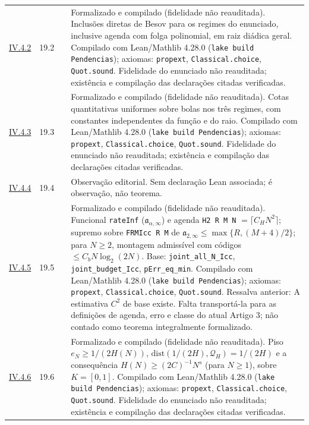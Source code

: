 \begin{longtable}{@{}p{.11\linewidth}p{.09\linewidth}p{.09\linewidth}p{.59\linewidth}@{}}
\hyperref[map:artigo_3:4.2]{IV.4.2} & 19.2 & \pageref{map:artigo_3:4.2} & Formalizado e compilado (fidelidade não reauditada). Inclusões diretas de Besov para os regimes do enunciado, inclusive agenda com folga polinomial, em raiz diádica geral. Compilado com Lean/Mathlib 4.28.0 (\texttt{lake build Pendencias}); axiomas: \texttt{propext}, \texttt{Classical.choice}, \texttt{Quot.sound}. Fidelidade do enunciado não reauditada; existência e compilação das declarações citadas verificadas.\\[4pt]
\hyperref[map:artigo_3:4.3]{IV.4.3} & 19.3 & \pageref{map:artigo_3:4.3} & Formalizado e compilado (fidelidade não reauditada). Cotas quantitativas uniformes sobre bolas nos três regimes, com constantes independentes da função e do raio. Compilado com Lean/Mathlib 4.28.0 (\texttt{lake build Pendencias}); axiomas: \texttt{propext}, \texttt{Classical.choice}, \texttt{Quot.sound}. Fidelidade do enunciado não reauditada; existência e compilação das declarações citadas verificadas.\\[4pt]
\hyperref[map:artigo_3:4.4]{IV.4.4} & 19.4 & \pageref{map:artigo_3:4.4} & Observação editorial. Sem declaração Lean associada; é observação, não teorema.\\[4pt]
\hyperref[map:artigo_3:4.5]{IV.4.5} & 19.5 & \pageref{map:artigo_3:4.5} & Formalizado e compilado (fidelidade não reauditada). Funcional \texttt{rateInf} ($\mathfrak{a}_{\alpha,\infty}$) e agenda \texttt{H2 R M N} $=\lceil C_H N^2\rceil$; supremo sobre \texttt{FRMIcc R M} de $\mathfrak{a}_{2,\infty}\le\max\{R,(M+4)/2\}$; para $N\ge 2$, montagem admissível com códigos $\le C_b N\log_2(2N)$. Base: \texttt{joint\_all\_N\_Icc}, \texttt{joint\_budget\_Icc}, \texttt{pErr\_eq\_min}. Compilado com Lean/Mathlib 4.28.0 (\texttt{lake build Pendencias}); axiomas: \texttt{propext}, \texttt{Classical.choice}, \texttt{Quot.sound}. Ressalva anterior: A estimativa $C^2$ de base existe. Falta transportá-la para as definições de agenda, erro e classe do atual Artigo 3; não contado como teorema integralmente formalizado.\\[4pt]
\hyperref[map:artigo_3:4.6]{IV.4.6} & 19.6 & \pageref{map:artigo_3:4.6} & Formalizado e compilado (fidelidade não reauditada). Piso $e_N\ge 1/(2H(N))$, $\mathrm{dist}(1/(2H),\mathcal{Q}_H)=1/(2H)$ e a consequência $H(N)\ge (2C)^{-1}N^s$ (para $N\ge 1$), sobre $K=[0,1]$. Compilado com Lean/Mathlib 4.28.0 (\texttt{lake build Pendencias}); axiomas: \texttt{propext}, \texttt{Classical.choice}, \texttt{Quot.sound}. Fidelidade do enunciado não reauditada; existência e compilação das declarações citadas verificadas.\\[4pt]

\end{longtable}
